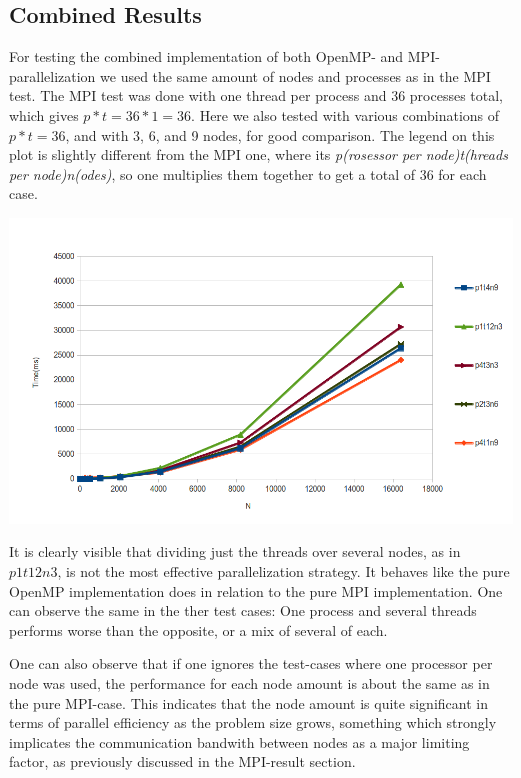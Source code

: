 \documentclass[fontsize=11pt,paper=a4,titlepage]{article}
\begin{document}
\subsection{Combined Results}
For testing the combined implementation of both OpenMP- and MPI-parallelization we used the same amount of nodes and processes as in the MPI test. The MPI test was done with one thread per process and 36 processes total, which gives $p*t = 36*1 = 36$. Here we also tested with various combinations of $p*t=36$, and with 3, 6, and 9 nodes, for good comparison. The legend on this plot is slightly different from the MPI one, where its \emph{p(rosessor per node)t(hreads per node)n(odes)}, so one multiplies them together to get a total of 36 for each case.

\hspace*{-3.3cm}\includegraphics[scale=0.73]{pics/plot.png}

It is clearly visible that dividing just the threads over several nodes, as in $p1t12n3$, is not the most effective parallelization strategy. It behaves like the pure OpenMP implementation does in relation to the pure MPI implementation. One can observe the same in the ther test cases: One process and several threads performs worse than the opposite, or a mix of several of each.

One can also observe that if one ignores the test-cases where one processor per node was used, the performance for each node amount is about the same as in the pure MPI-case. This indicates that the node amount is quite significant in terms of parallel efficiency as the problem size grows, something which strongly implicates the communication bandwith between nodes as a major limiting factor, as previously discussed in the MPI-result section.
\end{document}
